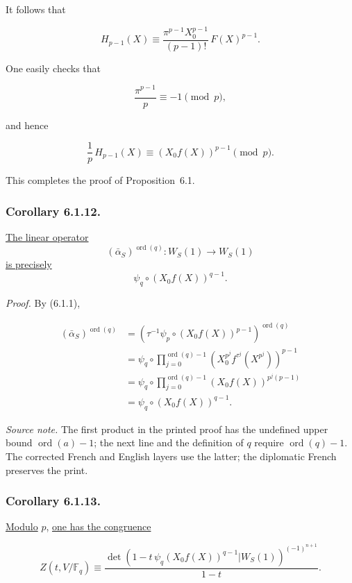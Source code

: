 It follows that

\begin{equation}\tag{6.1.9}
H_{p-1}(X)
\equiv\frac{\pi^{p-1}X_0^{p-1}}{(p-1)!}\,F(X)^{p-1}.
\end{equation}

One easily checks that

\begin{equation}\tag{6.1.10}
\frac{\pi^{p-1}}p\equiv-1\pmod p,
\end{equation}

and hence

\begin{equation}\tag{6.1.11}
\frac1p\,H_{p-1}(X)
\equiv(X_0f(X))^{p-1}\pmod p.
\end{equation}

This completes the proof of Proposition~6.1.

\subsubsection*{Corollary 6.1.12.}
\underline{The linear operator}
\[
(\bar\alpha_S)^{\operatorname{ord}(q)}:W_S(1)\longrightarrow W_S(1)
\]
\underline{is precisely}
\[
\psi_q\circ(X_0f(X))^{q-1}.
\]

\noindent\emph{Proof.}
By (6.1.1),

\begin{equation*}
\begin{aligned}
(\bar\alpha_S)^{\operatorname{ord}(q)}
&=
\left(
\tau^{-1}\psi_p\circ(X_0f(X))^{p-1}
\right)^{\operatorname{ord}(q)}\\
&=
\psi_q\circ
\prod_{j=0}^{\operatorname{ord}(q)-1}
\left(X_0^{p^j}f^{\tau^j}(X^{p^j})\right)^{p-1}\\
&=
\psi_q\circ
\prod_{j=0}^{\operatorname{ord}(q)-1}
(X_0f(X))^{p^j(p-1)}\\
&=\psi_q\circ(X_0f(X))^{q-1}.
\end{aligned}
\end{equation*}

\medskip
\noindent\emph{Source note.}
The first product in the printed proof has the undefined upper bound
$\operatorname{ord}(a)-1$; the next line and the definition of $q$ require
$\operatorname{ord}(q)-1$.  The corrected French and English layers use
the latter; the diplomatic French preserves the print.

\subsubsection*{Corollary 6.1.13.}
\underline{Modulo} $p$, \underline{one has the congruence}

\begin{equation*}
Z(t,V/\mathbb F_q)
\equiv
\frac{
\det\!\left(
1-t\,\psi_q(X_0f(X))^{q-1}
\mathrel{\Big|}W_S(1)
\right)^{(-1)^{n+1}}
}{1-t}.
\end{equation*}


